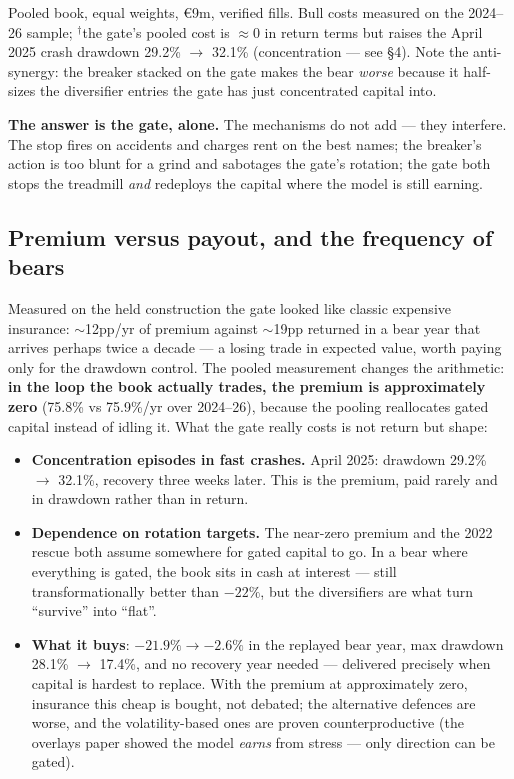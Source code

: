 \documentclass[11pt,a4paper]{article}
\newcommand{\tabnote}[1]{\begin{center}\begin{minipage}{0.92\textwidth}
  \footnotesize\color{bcgrey}#1\end{minipage}\end{center}}
\begin{document}
\tabnote{Pooled book, equal weights, €9m, verified fills. Bull costs measured on
the 2024--26 sample; $^{\dagger}$the gate's pooled cost is $\approx$0 in return
terms but raises the April 2025 crash drawdown 29.2\% $\rightarrow$ 32.1\%
(concentration --- see \S4). Note the anti-synergy: the breaker stacked on the
gate makes the bear \emph{worse} because it half-sizes the diversifier entries
the gate has just concentrated capital into.}

\textbf{The answer is the gate, alone.} The mechanisms do not add --- they
interfere. The stop fires on accidents and charges rent on the best names; the
breaker's action is too blunt for a grind and sabotages the gate's rotation; the
gate both stops the treadmill \emph{and} redeploys the capital where the model is
still earning.

\subsection{Premium versus payout, and the frequency of bears}

Measured on the held construction the gate looked like classic expensive
insurance: $\sim$12pp/yr of premium against $\sim$19pp returned in a bear year
that arrives perhaps twice a decade --- a losing trade in expected value, worth
paying only for the drawdown control. The pooled measurement changes the
arithmetic: \textbf{in the loop the book actually trades, the premium is
approximately zero} (75.8\% vs 75.9\%/yr over 2024--26), because the pooling
reallocates gated capital instead of idling it. What the gate really costs is
not return but shape:

\begin{itemize}
\item \textbf{Concentration episodes in fast crashes.} April 2025: drawdown
29.2\% $\rightarrow$ 32.1\%, recovery three weeks later. This is the premium,
paid rarely and in drawdown rather than in return.
\item \textbf{Dependence on rotation targets.} The near-zero premium and the
2022 rescue both assume somewhere for gated capital to go. In a bear where
everything is gated, the book sits in cash at interest --- still
transformationally better than $-22\%$, but the diversifiers are what turn
``survive'' into ``flat''.
\item \textbf{What it buys}: $-21.9\% \rightarrow -2.6\%$ in the replayed bear
year, max drawdown 28.1\% $\rightarrow$ 17.4\%, and no recovery year needed ---
delivered precisely when capital is hardest to replace. With the premium at
approximately zero, insurance this cheap is bought, not debated; the alternative
defences are worse, and the volatility-based ones are proven counterproductive
(the overlays paper showed the model \emph{earns} from stress --- only direction
can be gated).
\end{itemize}
\end{document}
